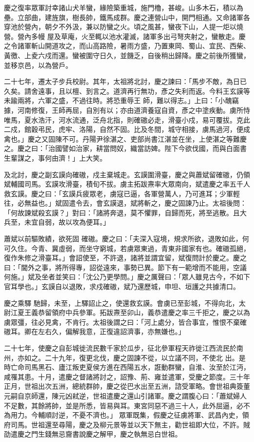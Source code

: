 \begin{pinyinscope}
 慶之復率眾軍討幸諸山犬羊蠻，緣險築重城，施門櫓，甚峻。山多木石，積以為壘。立部曲，建旌旗，樹長帥，鐵馬成群。慶之連營山中，開門相通。又命諸軍各穿池於營內，朝夕不外汲，兼以防蠻之火。頃之風甚，蠻夜下山，人提一炬以燒營。營內多幔
 屋及草庵，火至輒以池水灌滅，諸軍多出弓弩夾射之，蠻散走。慶之令諸軍斬山開道攻之，而山高路險，暑雨方盛，乃置東岡、蜀山、宜民、西柴、黃徼、上夌六戍而還。蠻被圍守日久，並饑乏，自後稍出歸降。慶之前後所獲蠻，並移京邑，以為營戶。



 二十七年，遷太子步兵校尉。其年，太祖將北討，慶之諫曰：「馬步不敵，為日已久矣。請舍遠事，且以檀、到言之。道濟再行無功，彥之失利而返。今料王玄謨等未踰兩將，六軍之盛，不過往時。將恐重辱王
 師，難以得志。」上曰：「小醜竊據，河南修復，王師再屈，自別有以；亦由道濟養寇自資，彥之中塗疾動。虜所恃唯馬，夏水浩汗，河水流通，泛舟北指，則確磝必走，滑臺小戍，易可覆拔。克此二戍，館穀弔民，虎牢、洛陽，自然不固。比及冬間，城守相接，虜馬過河，便成禽也。」慶之又固陳不可。丹陽尹徐湛之、吏部尚書江湛並在坐，上使湛之等難慶之。慶之曰：「治國譬如治家，耕當問奴，織當訪婢。陛下今欲伐國，而與白面書生輩謀之，事何由濟！」上大笑。



 及北討，慶之副玄謨向確磝，戍主棄城走。玄謨圍滑臺，慶之與蕭斌留確磝，仍領斌輔國司馬。玄謨攻滑臺，積旬不拔。虜主拓跋燾率大眾南向，斌遣慶之率五千人救玄謨。慶之曰：「玄謨兵疲眾老，虜寇已逼，各軍營萬人，乃可進耳；少軍輕往，必無益也。」斌固遣令去，會玄謨退，斌將斬之，慶之固諫乃止。太祖後問：「何故諫斌殺玄謨？」對曰：「諸將奔退，莫不懼罪，自歸而死，將至逃散。且大兵至，未宜自弱，故以攻為便耳。」



 蕭斌以前驅敗績，欲死固
 確磝。慶之曰：「夫深入寇境，規求所欲，退敗如此，何可久住。今青、冀虛弱，而坐守窮城，若虜眾東過，青東非國家有也。確磝孤絕，復作朱修之滑臺耳。」會詔使至，不許退，諸將並謂宜留，斌復問計於慶之。慶之曰：「閫外之事，將所得專，詔從遠來，事勢已異。節下有一範增而不能用，空議何施。」斌及坐者並笑曰：「沈公乃更學問。」慶之厲聲曰：「眾人雖見古今，不如下官耳學也。」玄謨自以退敗，求戍確磝，斌乃還歷城，申坦、垣護之共據清口。



 慶之乘驛
 馳歸，未至，上驛詔止之，使還救玄謨。會虜已至彭城，不得向北，太尉江夏王義恭留領府中兵參軍。拓跋燾至卯山，義恭遣慶之率三千拒之，慶之以為虜眾彊，往必見禽，不肯行。太祖後謂之曰：「河上處分，皆合事宜，惟恨不棄確磝耳。卿在左右久，偏解我意，正復違詔濟事，亦無嫌也。」



 二十七年，使慶之自彭城徙流民數千家於瓜步，征北參軍程天祚徙江西流民於南州，亦如之。二十九年，復更北伐，慶之固諫不從，以立議不同，不使北
 出。是時亡命司馬黑石、廬江叛吏夏侯方進在西陽五水，誑動群蠻，自淮、汝至於江沔，咸罹其患。十月，遣慶之督諸將討之，詔豫、荊、雍並遣軍，受慶之節度。三十年正月，世祖出次五洲，總統群帥，慶之從巴水出至五洲，諮受軍略。會世祖典簽董元嗣自京師還，陳元凶弒逆，世祖遣慶之還山引諸軍。慶之謂腹心曰：「蕭斌婦人不足數，其餘將帥，並是所悉，皆易與耳。東宮同惡不過三十人，此外屈逼，必不為用力。今輔順討逆，不憂不濟也。」
 眾軍既集，假慶之征虜將軍、武昌內史，領府司馬。世祖還至尋陽，慶之及柳元景等並以天下無主，勸世祖即大位，不許。賊劭遣慶之門生錢無忌齎書說慶之解甲，慶之執無忌白世祖。




\end{pinyinscope}
